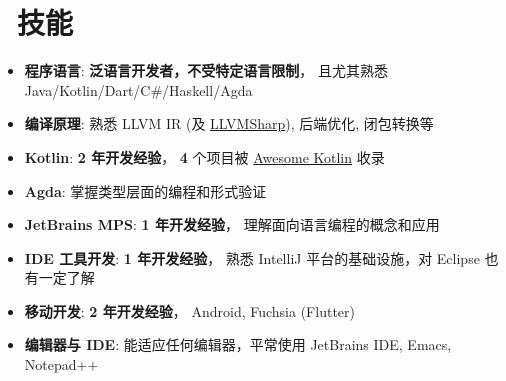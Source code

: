\documentclass{resume}
\begin{document}
\section{\faCogs\ 技能}
\begin{itemize}[parsep=0.5ex]
  \item \textbf{程序语言}:
    \textbf{泛语言开发者，不受特定语言限制}，
    且尤其熟悉 Java/Kotlin/Dart/C\#/Haskell/Agda

  \item \textbf{编译原理}:
    熟悉 LLVM IR (及 \href{https://github.com/Microsoft/LLVMSharp/} {LLVMSharp}), 后端优化, 闭包转换等

  \item \textbf{Kotlin}:
    \textbf{2 年开发经验}，
    \textbf{4} 个项目被
    \href{https://kotlin.link/?q=ice} {Awesome Kotlin}
    收录

  \item \textbf{Agda}:
    掌握类型层面的编程和形式验证

  \item \textbf{JetBrains MPS}:
    \textbf{1 年开发经验}，
    理解面向语言编程的概念和应用

  \item \textbf{IDE 工具开发}:
    \textbf{1 年开发经验}，
    熟悉 IntelliJ 平台的基础设施，对 Eclipse 也有一定了解

  \item \textbf{移动开发}:
    \textbf{2 年开发经验}，
    Android, Fuchsia (Flutter)

  \item \textbf{编辑器与 IDE}:
    能适应任何编辑器，平常使用 JetBrains IDE, Emacs, Notepad++
\end{itemize}

\end{document}
